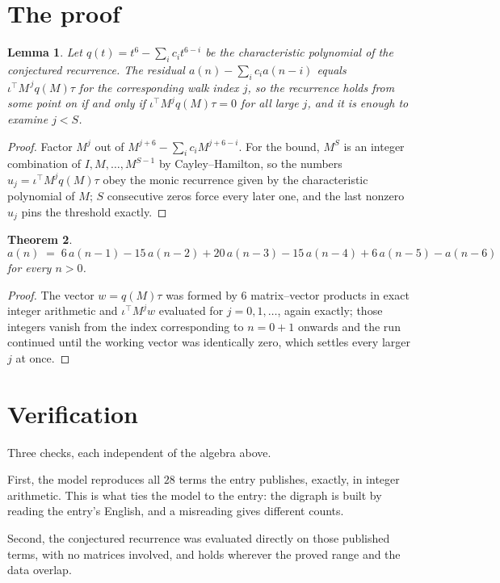 \documentclass[11pt,a4paper]{article}
\theoremstyle{plain}
\newtheorem{theorem}{Theorem}
\newtheorem{lemma}[theorem]{Lemma}
\theoremstyle{definition}
\begin{document}
\section{The proof}

\begin{lemma}\label{lem:crit}
Let $q(t)=t^{6}-\sum_i c_it^{6-i}$ be the characteristic polynomial of the
conjectured recurrence. The residual $a(n)-\sum_ic_ia(n-i)$ equals
$\iota^{\!\top}M^{\,j}q(M)\tau$ for the corresponding walk index $j$, so the recurrence
holds from some point on if and only if $\iota^{\!\top}M^{j}q(M)\tau=0$ for all large $j$,
and it is enough to examine $j<S$.
\end{lemma}

\begin{proof}
Factor $M^{j}$ out of $M^{j+6}-\sum_ic_iM^{j+6-i}$. For the bound, $M^{S}$
is an integer combination of $I,M,\dots,M^{S-1}$ by Cayley--Hamilton, so the numbers
$u_j=\iota^{\!\top}M^{j}q(M)\tau$ obey the monic recurrence given by the characteristic
polynomial of $M$; $S$ consecutive zeros force every later one, and the last nonzero $u_j$
pins the threshold exactly.
\end{proof}

\begin{theorem}
\[
a(n)\;=\;6\,a(n-1) - 15\,a(n-2) + 20\,a(n-3) - 15\,a(n-4) + 6\,a(n-5) - a(n-6)
\]
for every $n>0$.
\end{theorem}

\begin{proof}
The vector $w=q(M)\tau$ was formed by $6$ matrix--vector products in exact integer
arithmetic and $\iota^{\!\top}M^{j}w$ evaluated for $j=0,1,\dots$, again exactly; those
integers vanish from the index corresponding to $n=0+1$ onwards and the run continued
until the working vector was identically zero, which settles every larger $j$ at once.
\end{proof}

\section{Verification}

Three checks, each independent of the algebra above.

First, the model reproduces all $28$ terms the entry publishes, exactly, in integer
arithmetic. This is what ties the model to the entry: the digraph is built by reading the
entry's English, and a misreading gives different counts.

Second, the conjectured recurrence was evaluated directly on those published terms, with no
matrices involved, and holds wherever the proved range and the data overlap.
\end{document}
